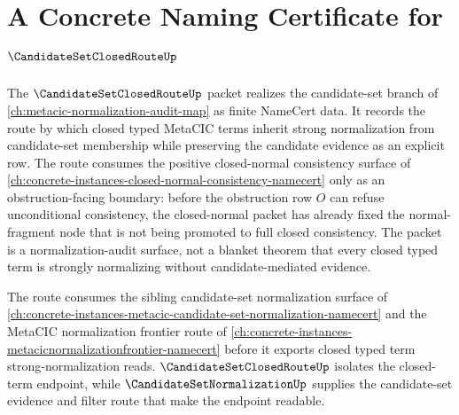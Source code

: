 \chapter{A Concrete Naming Certificate for $\CandidateSetClosedRouteUp$}
\label{ch:concrete-instances-candidate-set-closed-route-namecert}

The $\CandidateSetClosedRouteUp$ packet realizes the candidate-set branch of \autoref{ch:metacic-normalization-audit-map} as finite NameCert data. It records the route by which closed typed MetaCIC terms inherit strong normalization from candidate-set membership while preserving the candidate evidence as an explicit row. The route consumes the positive closed-normal consistency surface of \autoref{ch:concrete-instances-closed-normal-consistency-namecert} only as an obstruction-facing boundary: before the obstruction row $O$ can refuse unconditional consistency, the closed-normal packet has already fixed the normal-fragment node that is not being promoted to full closed consistency. The packet is a normalization-audit surface, not a blanket theorem that every closed typed term is strongly normalizing without candidate-mediated evidence.

The route consumes the sibling candidate-set normalization surface of \autoref{ch:concrete-instances-metacic-candidate-set-normalization-namecert} and the MetaCIC normalization frontier route of \autoref{ch:concrete-instances-metacicnormalizationfrontier-namecert} before it exports closed typed term strong-normalization reads. $\CandidateSetClosedRouteUp$ isolates the closed-term endpoint, while $\CandidateSetNormalizationUp$ supplies the candidate-set evidence and filter route that make the endpoint readable.

